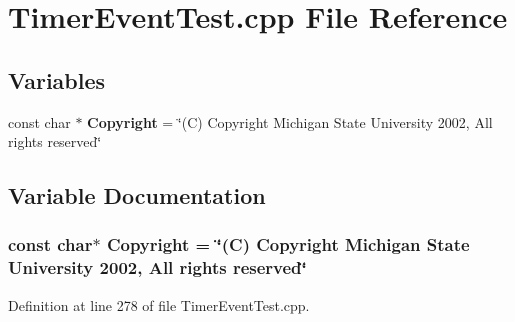 \section{Timer\-Event\-Test.cpp File Reference}
\label{TimerEventTest_8cpp}
\subsection*{Variables}
\begin{CompactItemize}
\item 
const char $\ast$ {\bf Copyright} = \char`\"{}(C) Copyright Michigan State University 2002, All rights reserved\char`\"{}
\end{CompactItemize}


\subsection{Variable Documentation}
\subsubsection{\setlength{\rightskip}{0pt plus 5cm}const char$\ast$ Copyright = \char`\"{}(C) Copyright Michigan State University 2002, All rights reserved\char`\"{}\hspace{0.3cm}{\tt  [static]}}\label{TimerEventTest_8cpp_a0}




Definition at line 278 of file Timer\-Event\-Test.cpp.